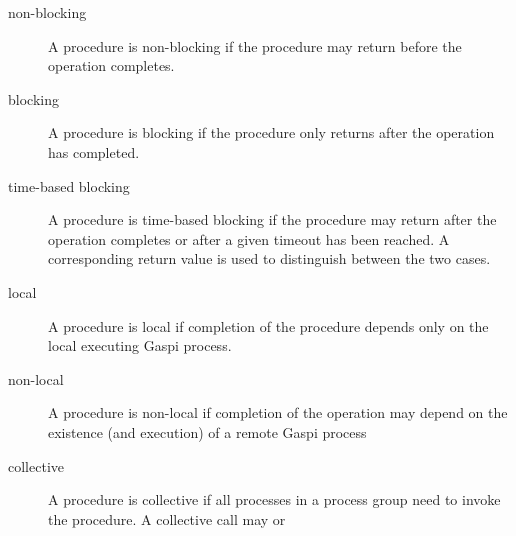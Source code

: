 \documentclass[a4paper]{article}
\newlength{\st}\setlength{\st}{0pt}
\newcommand{\GASPI}{{\sc Gaspi}}
\begin{document}
\begin{description}
\item[non-blocking] A procedure is non-blocking if the procedure may
  return before the operation completes.
\begin{center}
\end{center}
\item[blocking] A procedure is blocking if the procedure only returns
  after the operation has completed.
\begin{center}
\end{center}
\item[time-based blocking] A procedure is time-based blocking if the
  procedure may return after the operation completes or after a given
  timeout has been reached. A corresponding return value is used to
  distinguish between the two cases.
\begin{center}
\end{center}
\item[local] A procedure is local if completion of the procedure depends
  only on the local executing \GASPI{} process.
\item[non-local] A procedure is non-local if completion of the
  operation may depend on the existence (and execution) of a remote \GASPI{} process
\item[collective] A procedure is collective if all processes in a
  process group need to invoke the procedure. A collective call may or

\end{description}
\end{document}
